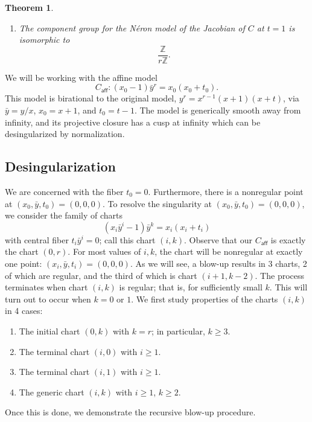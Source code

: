 \documentclass[reqno]{amsart}
\newtheorem{theorem}{Theorem}[section]
\theoremstyle{definition}
\theoremstyle{remark}
\newcommand{\sy}{\bar{y}}
\def\Z{\mathbb{Z}}
\def\caff{C_{\textsf{aff}}}
\begin{document}
\begin{theorem}
\begin{enumerate}
\begin{figure}[h]
\[{  !{(3,3) }*{\bullet}="es"
  !{(3,2.6) }*{}="eabove"
  !{(3,2.1) }*{\vdots}="espace"
  !{(3,1.5) }*{}="ebelow"
  !{(3,1) }*{\bullet}="e2"
  !{(3.5,1) }*{E_2}
  !{(3,0) }*{\bullet}="e1"
  !{(3.5,0) }*{E_1}
  "f"-@/^0.5cm/"g"
  "f"-@/_0.5cm/"g"
  "g"-"ds"
  "ds"-"dabove"
  "dbelow"-"d2"
  "d2"-"d1"
  "g"-"es"
  "es"-"eabove"
  "ebelow"-"e2"
  "e2"-"e1"
}
\]
  \caption{Dual graph of $C_k$, $t=1$, $r$ even}
\label{fig:superelliptic-dual-graph-even}
\end{figure}
In that figure, $F$ has multiplicity 1, $G_s$ has multiplicity $s$, and $D_i, E_i$ each have multiplicity $i$.
  \item The component group for the N\'eron model of the Jacobian of $C$ at $t = 1$ is isomorphic to
\[
\frac{\Z}{r\Z}.
\]
  \end{enumerate}
\end{theorem}

We will be working with the affine model
\[
\caff: (x_0 - 1) \sy^r = x_0(x_0 + t_0).
\]
This model is birational to the original model, $y^r = x^{r-1}(x+1)(x+t)$, via $\sy = y/x$, $x_0 = x + 1$, and $t_0 = t - 1$. The model is generically smooth away from infinity, and its projective closure has a cusp at infinity which can be desingularized by normalization. 

\subsection{Desingularization}
\label{sec:desingularization-t-equals-one}

We are concerned with the fiber $t_0 = 0$. Furthermore, there is a nonregular point at $(x_0, \sy, t_0) = (0, 0, 0)$. To resolve the singularity at $(x_0, \sy, t_0) = (0, 0, 0)$, we consider the family of charts
\[
(x_i\sy^i - 1) \sy^k = x_i(x_i + t_i)
\]
with central fiber $t_i\sy^i = 0$; call this chart $(i,k)$. Observe that our $\caff$ is exactly the chart $(0,r)$. For most values of $i, k$, the chart will be nonregular at exactly one point: $(x_i, \sy, t_i) = (0, 0, 0)$. As we will see, a blow-up results in 3 charts, 2 of which are regular, and the third of which is chart $(i+1, k-2)$. The process terminates when chart $(i, k)$ is regular; that is, for sufficiently small $k$. This will turn out to occur when $k = 0$ or $1$. We first study properties of the charts $(i, k)$ in 4 cases:
\begin{enumerate}
    \item The initial chart $(0, k)$ with $k = r$; in particular, $k \geq 3$.
    \item The terminal chart $(i, 0)$ with $i \geq 1$.
    \item The terminal chart $(i, 1)$ with $i \geq 1$.
    \item The generic chart $(i, k)$ with $i \geq 1$, $k \geq 2$.
\end{enumerate}
Once this is done, we demonstrate the recursive blow-up procedure.
\end{document}
